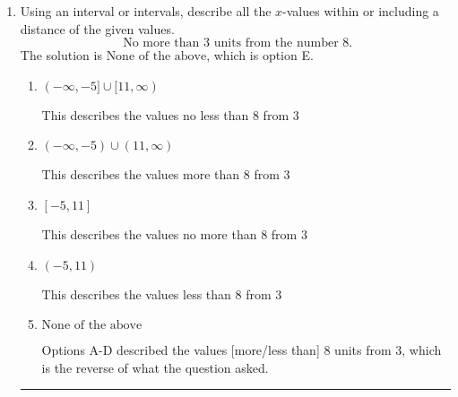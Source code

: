 \documentclass{extbook}[14pt]
\newcommand{\litem}[1]{\item #1

\rule{\textwidth}{0.4pt}}
\begin{document}
\begin{enumerate}
{\begin{enumerate}[label=\Alph*.]
* $(-\infty, 0.467)$, which is the correct option.
\item \( (-\infty, a), \text{ where } a \in [-0.47, -0.21] \)

 $(-\infty, -0.467)$, which corresponds to negating the endpoint of the solution.
\item \( (a, \infty), \text{ where } a \in [-0.39, 0.59] \)

 $(0.467, \infty)$, which corresponds to switching the direction of the interval. You likely did this if you did not flip the inequality when dividing by a negative!
\item \( (a, \infty), \text{ where } a \in [-1.06, 0.39] \)

 $(-0.467, \infty)$, which corresponds to switching the direction of the interval AND negating the endpoint. You likely did this if you did not flip the inequality when dividing by a negative as well as not moving values over to a side properly.
\item \( \text{None of the above}. \)

You may have chosen this if you thought the inequality did not match the ends of the intervals.
\end{enumerate}

\textbf{General Comment:} Remember that less/greater than or equal to includes the endpoint, while less/greater do not. Also, remember that you need to flip the inequality when you multiply or divide by a negative.
}
\litem{
Using an interval or intervals, describe all the $x$-values within or including a distance of the given values.
\[ \text{ No more than } 3 \text{ units from the number } 8. \]The solution is \( \text{None of the above} \), which is option E.\begin{enumerate}[label=\Alph*.]
\item \( (-\infty, -5] \cup [11, \infty) \)

This describes the values no less than 8 from 3
\item \( (-\infty, -5) \cup (11, \infty) \)

This describes the values more than 8 from 3
\item \( [-5, 11] \)

This describes the values no more than 8 from 3
\item \( (-5, 11) \)

This describes the values less than 8 from 3
\item \( \text{None of the above} \)

Options A-D described the values [more/less than] 8 units from 3, which is the reverse of what the question asked.
\end{enumerate}

}
\end{enumerate}
\end{document}
